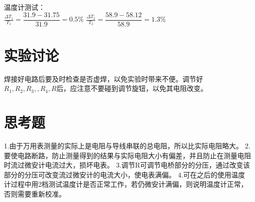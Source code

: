 \documentclass{report}
\begin{document}
	温度计测试：\\
	$ \frac{\Delta T_1}{T_1}=\dfrac{31.9-31.75}{31.9}=0.5\% $\qquad
	$ \frac{\Delta T_2}{T_2}=\dfrac{58.9-58.12}{58.9}=1.3\% $
	
	
	\section{实验讨论}
	焊接好电路后要及时检查是否虚焊，以免实验时带来不便。调节好$ R_1,R_2,R_3,,R_4,R $后，应注意不要碰到调节旋钮，以免其电阻改变。
	\section{思考题}
	1.由于万用表测量的实际上是电阻与导线串联的总电阻，所以比实际电阻略大。
	2.要使电路断路，防止测量得到的结果与实际电阻大小有偏差，并且防止在测量电阻时流过微安计电流过大，损坏电表。
	3.调节R可调节电桥部分的分压，通过改变该部分的分压可改变流过微安计的电流大小，使电表满偏。
	4.可在之后的使用温度计过程中用2档测试温度计是否正常工作，若仍微安计满偏，则说明温度计正常，否则需要重新校准。
	
\end{document}
